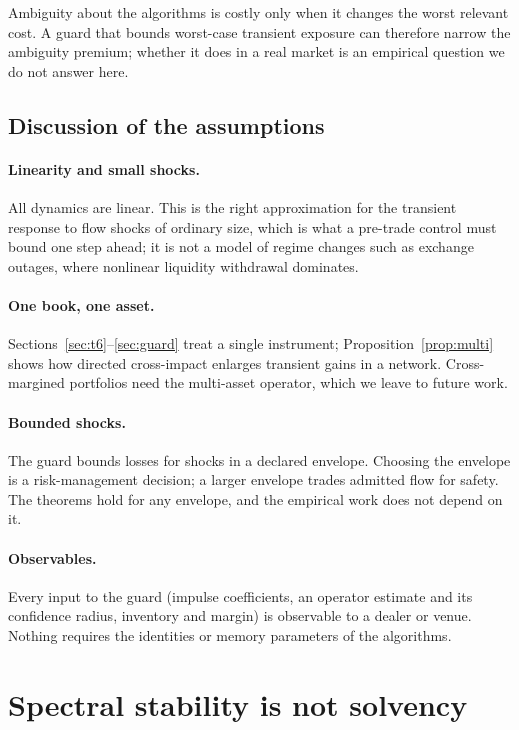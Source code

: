 \documentclass[12pt]{article}
\theoremstyle{definition}
\theoremstyle{remark}
\begin{document}
Ambiguity about the algorithms is costly only when it changes the worst relevant cost. A guard that bounds worst-case transient exposure can therefore narrow the ambiguity premium; whether it does in a real market is an empirical question we do not answer here.

\subsection{Discussion of the assumptions}

\paragraph{Linearity and small shocks.} All dynamics are linear. This is the right approximation for the transient response to flow shocks of ordinary size, which is what a pre-trade control must bound one step ahead; it is not a model of regime changes such as exchange outages, where nonlinear liquidity withdrawal dominates.

\paragraph{One book, one asset.} Sections~\ref{sec:t6}--\ref{sec:guard} treat a single instrument; Proposition~\ref{prop:multi} shows how directed cross-impact enlarges transient gains in a network. Cross-margined portfolios need the multi-asset operator, which we leave to future work.

\paragraph{Bounded shocks.} The guard bounds losses for shocks in a declared envelope. Choosing the envelope is a risk-management decision; a larger envelope trades admitted flow for safety. The theorems hold for any envelope, and the empirical work does not depend on it.

\paragraph{Observables.} Every input to the guard (impulse coefficients, an operator estimate and its confidence radius, inventory and margin) is observable to a dealer or venue. Nothing requires the identities or memory parameters of the algorithms.

\section{Spectral stability is not solvency}\label{sec:radius}
\end{document}
